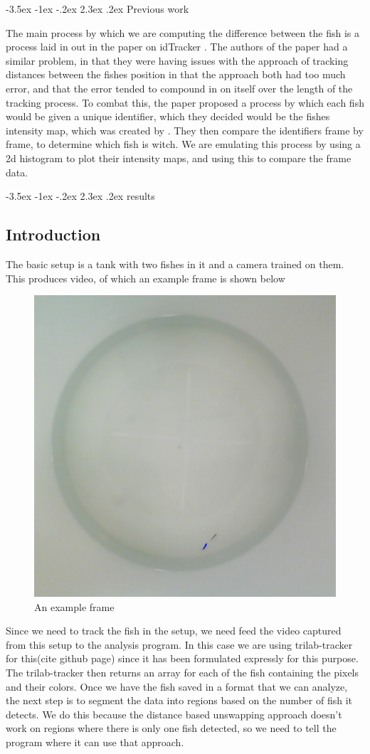 \documentclass{article}
\makeatletter
\renewcommand\section{\clearpage\newpage\@startsection {section}{1}{\z@}%
	{-3.5ex \@plus -1ex \@minus -.2ex}%
	{2.3ex \@plus.2ex}%
	{\normalfont\Large\bfseries}}
\makeatother
\begin{document}
\section{Previous work}

The main process by which we are computing the difference between the fish is a process laid in out in the paper on idTracker \cite{idTracker}. The authors of the paper had a similar problem, in that they were having issues with the approach of tracking distances between the fishes position in that the approach both had too much error, and that the error tended to compound in on itself over the length of the tracking process. To combat this, the paper proposed a process by which each fish would be given a unique identifier, which they decided would be the fishes intensity map, which was created by . They then compare the identifiers frame by frame, to determine which fish is witch. We are emulating this process by using a 2d histogram to plot their intensity maps, and using this to compare the frame data.

\section{results}



\subsection{Introduction}
The basic setup is a tank with two fishes in it and a camera trained on them. This produces video, of which an example frame is shown below

\begin{figure}[H]
	\centering
	\includegraphics[width=.5\linewidth]{fish}
	\caption{An example frame}
\end{figure}

Since we need to track the fish in the setup, we need feed the video captured from this setup to the analysis program. In this case we are using trilab-tracker for this(cite github page) since it has been formulated expressly for this purpose. The trilab-tracker then returns an array for each of the fish containing the pixels and their colors. Once we have the fish saved in a format that we can analyze, the next step is to segment the data into regions based on the number of fish it detects. We do this because the distance based unswapping approach doesn't work on regions where there is only one fish detected, so we need to tell the program where it can use that approach.
\end{document}
